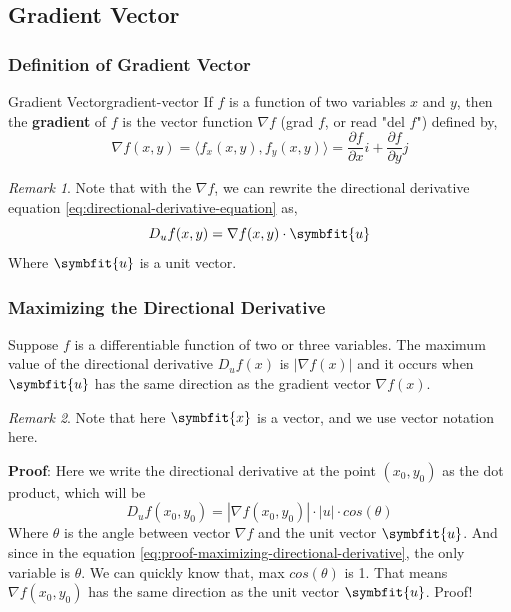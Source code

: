 \documentclass[math,code]{amznotes}
\theoremstyle{remark}
\newtheorem*{remark}{Remark}
\begin{document}
\subsection{Gradient Vector}
\subsubsection{Definition of Gradient Vector}
\begin{dfnbox}{Gradient Vector}{gradient-vector}
    If $f$ is a function of two variables $x$ and $y$, then the {\color{red} \textbf{gradient}} of $f$ is the vector function $\nabla f$ (grad $f$, or read "del $f$") defined by,
    \begin{displaymath}
        \nabla f(x,y)=\langle f_x(x,y), f_y(x,y) \rangle = \frac{\partial f}{\partial x}i+\frac{\partial f}{\partial y}j
    \end{displaymath}
\end{dfnbox}
\begin{notebox}
    \begin{remark}
        Note that with the $\nabla f$, we can rewrite the directional derivative equation \eqref{eq:directional-derivative-equation} as,
        \begin{equation}
            D_uf(x,y)=\nabla f(x,y) \cdot \symbfit{u}
        \end{equation}
        Where $\symbfit{u}$ is a unit vector.
    \end{remark}
\end{notebox}
\subsubsection{Maximizing the Directional Derivative}
Suppose $f$ is a differentiable function of two or three variables. The maximum value of the directional derivative $D_uf(x)$ is $|\nabla f(x)|$ and it occurs when $\symbfit{u}$ has the same direction as the gradient vector $\nabla f(x)$.
\begin{notebox}
    \begin{remark}
        Note that here $\symbfit{x}$ is a vector, and we use vector notation here.
    \end{remark}
\end{notebox}
{\textbf{Proof}}: \newline
Here we write the directional derivative at the point $(x_0, y_0)$ as the dot product, which will be
\begin{equation} \label{eq:proof-maximizing-directional-derivative}
    D_uf(x_0,y_0)=|\nabla f(x_0,y_0)| \cdot |u| \cdot cos(\theta)
\end{equation}
Where $\theta$ is the angle between vector $\nabla f$ and the unit vector $\symbfit{u}$. And since in the equation \eqref{eq:proof-maximizing-directional-derivative}, the only variable is $\theta$. We can quickly know that, max $cos(\theta)$ is 1. That means $\nabla f(x_0,y_0)$ has the same direction as the unit vector $\symbfit{u}$. Proof!
\end{document}
